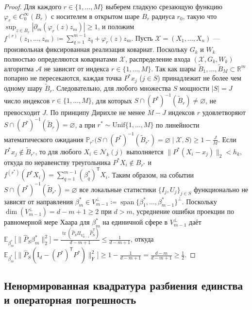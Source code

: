 \documentclass[11pt,a4paper]{article}
\newcommand{\R}{\mathbb{R}}
\newcommand{\E}{\mathbb{E}}
\newcommand{\Prob}{\mathbb{P}}
\newcommand{\Id}{\mathrm{I}}
\newcommand{\T}{^{\mathsf{T}}}
\newcommand{\F}{_{\mathrm{F}}}
\newcommand{\PEDRs}{P^{*}}
\DeclareMathOperator{\tr}{tr}
\DeclareMathOperator{\spanop}{span}
\theoremstyle{definition}
\theoremstyle{remark}
\begin{document}
\begin{proof}
Для каждого $r \in \{1, \ldots, M\}$ выберем гладкую срезающую функцию $\varphi_r \in C_0^\infty(B_r)$ с носителем в открытом шаре $B_r$ радиуса $r_0$, такую что $\sup_{z \in B_r}|\partial_m(\varphi_r(z) z_m)| \ge 1$, и положим $f^{(r)}(z_1, \ldots, z_m) \coloneqq \sum_{q=1}^{m-1} z_q + \varphi_r(z) z_m$.
Пусть $\mathcal{X} = (X_1, \ldots, X_n)$ --- произвольная фиксированная реализация ковариат. Поскольку $G_k$ и $W_k$ полностью определяются ковариатами $\mathcal{X}$, распределение входа $(\mathcal{X}, G_k, W_k)$ алгоритма $\mathcal{A}$ не зависит от индекса $r \in \{1, \ldots, M\}$. Так как шары $\widetilde{B}_1, \ldots, \widetilde{B}_M \subset \R^m$ попарно не пересекаются, каждая точка $\PEDRs x_j$ ($j \in S$) принадлежит не более чем одному шару $\widetilde{B}_r$. Следовательно, для любого множества $S$ мощности $|S| = J$ число индексов $r \in \{1, \ldots, M\}$, для которых $S \cap (\PEDRs)^{-1}(\widetilde{B}_r) \neq \varnothing$, не превосходит $J$. По принципу Дирихле не менее $M - J$ индексов $r$ удовлетворяют $S \cap (\PEDRs)^{-1}(\widetilde{B}_r) = \varnothing$, а при $r^* \sim \mathrm{Unif}\{1, \ldots, M\}$ по линейности математического ожидания $\Prob_{r^*}\bigl(S \cap (\PEDRs)^{-1}(\widetilde{B}_{r^*}) = \varnothing \mid \mathcal{X}, S\bigr) \ge 1 - \frac{J}{M}$.
Если $\PEDRs x_j \notin \widetilde{B}_{r^*}$, то для любого $X_i \in \mathcal{N}_k(j)$ выполняется $\|\PEDRs(X_i - x_j)\|_2 < h_k$, откуда по неравенству треугольника $\PEDRs X_i \notin B_{r^*}$ и $f^{(r^*)}(\PEDRs X_i) = \sum_{q=1}^{m-1} (\beta_q^*)\T X_i$. Таким образом, на событии $S \cap (\PEDRs)^{-1}(\widetilde{B}_{r^*}) = \varnothing$ все локальные статистики $\{I_j, U_j\}_{j \in S}$ функционально не зависят от направления $\beta_m^* \in V_{m-1}^\perp \coloneqq \spanop\{\beta_1^*, \ldots, \beta_{m-1}^*\}^\perp$. Поскольку $\dim(V_{m-1}^\perp) = d - m + 1 \ge 2$ при $d > m$, усреднение ошибки проекции по равномерной мере Хаара для $\beta_m^*$ на единичной сфере в $V_{m-1}^\perp$ даёт $\E_{\beta_m^*}\bigl[\|\hat{P}_S \beta_m^*\|_2^2\bigr] = \frac{\tr(\hat{P}_S \Pi_{V_{m-1}^\perp}\hat{P}_S\T)}{d - m + 1} \le \frac{1}{d - m + 1}$, откуда $\E_{\beta_m^*}\bigl[\|\hat{P}_S(\Id_d - (\PEDRs)\T \PEDRs)\|\F^2\bigr] \ge 1 - \frac{1}{d - m + 1} = \frac{d - m}{d - m + 1} \ge \frac{1}{2}$.
\end{proof}

\subsection{Ненормированная квадратура разбиения единства и операторная погрешность}
\end{document}

